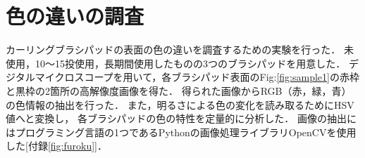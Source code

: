 \documentclass[main]{subfiles}
\begin{document}
\section{色の違いの調査}
カーリングブラシパッドの表面の色の違いを調査するための実験を行った．
未使用，10～15投使用，長期間使用したものの3つのブラシパッドを用意した．
デジタルマイクロスコープを用いて，各ブラシパッド表面のFig:\ref{fig:sample1}の赤枠と黒枠の2箇所の高解像度画像を得た．
得られた画像からRGB（赤，緑，青）の色情報の抽出を行った．
また，明るさによる色の変化を読み取るためにHSV値へと変換し，
各ブラシパッドの色の特性を定量的に分析した．
画像の抽出にはプログラミング言語の1つであるPythonの画像処理ライブラリOpenCVを使用した[付録\ref{fig:furoku}]．
\end{document}
